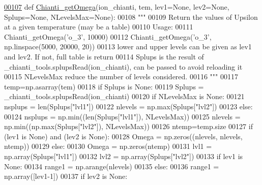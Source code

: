 \begin{DoxyCode}
\hypertarget{namespacepyneb_1_1utils_1_1pn__chianti_l00107}{}\hyperlink{namespacepyneb_1_1utils_1_1pn__chianti_a651b939729d0f5afb817a47a974bfaa1}{00107} \textcolor{keyword}{def }\hyperlink{namespacepyneb_1_1utils_1_1pn__chianti_a651b939729d0f5afb817a47a974bfaa1}{Chianti\_getOmega}(ion\_chianti, tem, lev1=None, lev2=None, Splups=None, NLevelsMax=None):
00108     \textcolor{stringliteral}{"""}
00109 \textcolor{stringliteral}{    Return the values of Upsilon at a given temperature (may be a table)}
00110 \textcolor{stringliteral}{    Usage:}
00111 \textcolor{stringliteral}{        Chianti\_getOmega('o\_3', 10000)}
00112 \textcolor{stringliteral}{        Chianti\_getOmega('o\_3', np.linspace(5000, 20000, 20))}
00113 \textcolor{stringliteral}{    lower and upper levels can be given as lev1 and lev2. If not, full table is return}
00114 \textcolor{stringliteral}{    Splups is the result of \_chianti\_tools.splupsRead(ion\_chianti), can be passed to avoid reloading it}
00115 \textcolor{stringliteral}{    NLevelsMax reduce the number of levels considered.}
00116 \textcolor{stringliteral}{    """}
00117     temp=np.asarray(tem)
00118     \textcolor{keywordflow}{if} Splups \textcolor{keywordflow}{is} \textcolor{keywordtype}{None}:
00119         Splups = \_chianti\_tools.splupsRead(ion\_chianti)
00120     \textcolor{keywordflow}{if} NLevelsMax \textcolor{keywordflow}{is} \textcolor{keywordtype}{None}:
00121         nsplups = len(Splups[\textcolor{stringliteral}{"lvl1"}])
00122         nlevels = np.max(Splups[\textcolor{stringliteral}{"lvl2"}])
00123     \textcolor{keywordflow}{else}:
00124         nsplups = np.min((len(Splups[\textcolor{stringliteral}{"lvl1"}]), NLevelsMax))
00125         nlevels = np.min((np.max(Splups[\textcolor{stringliteral}{"lvl2"}]), NLevelsMax))
00126     ntemp=temp.size
00127     \textcolor{keywordflow}{if} (lev1 \textcolor{keywordflow}{is} \textcolor{keywordtype}{None}) \textcolor{keywordflow}{and} (lev2 \textcolor{keywordflow}{is} \textcolor{keywordtype}{None}):
00128         Omega = np.zeros((nlevels, nlevels, ntemp))
00129     \textcolor{keywordflow}{else}:
00130         Omega = np.zeros(ntemp)
00131     lvl1 = np.array(Splups[\textcolor{stringliteral}{"lvl1"}])
00132     lvl2 = np.array(Splups[\textcolor{stringliteral}{"lvl2"}])
00133     \textcolor{keywordflow}{if} lev1 \textcolor{keywordflow}{is} \textcolor{keywordtype}{None}:
00134         range1 = np.arange(nlevels)
00135     \textcolor{keywordflow}{else}:
00136         range1 = np.array([lev1-1])
00137     \textcolor{keywordflow}{if} lev2 \textcolor{keywordflow}{is} \textcolor{keywordtype}{None}:

\end{DoxyCode}
